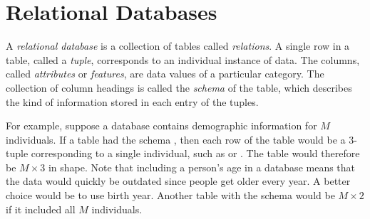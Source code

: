 


\section*{Relational Databases} %

A \emph{relational database} is a collection of tables called \emph{relations}.
A single row in a table, called a \emph{tuple}, corresponds to an individual instance of data.
The columns, called \emph{attributes} or \emph{features}, are data values of a particular category.
The collection of column headings is called the \emph{schema} of the table, which describes the kind of information stored in each entry of the tuples.

For example, suppose a database contains demographic information for $M$ individuals.
If a table had the schema , then each row of the table would be a $3$-tuple corresponding to a single individual, such as  or .
The table would therefore be $M\times 3$ in shape.
Note that including a person's age in a database means that the data would quickly be outdated since people get older every year. 
A better choice would be to use birth year.
Another table with the schema  would be $M \times 2$ if it included all $M$ individuals.

